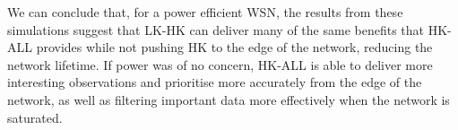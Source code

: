 We can conclude that, for a power efficient WSN, the results from these simulations suggest that LK-HK can deliver many of the same benefits that HK-ALL provides while not pushing HK to the edge of the network, reducing the network lifetime. If power was of no concern, HK-ALL is able to deliver more interesting observations and prioritise more accurately from the edge of the network, as well as filtering important data more effectively when the network is saturated.







































